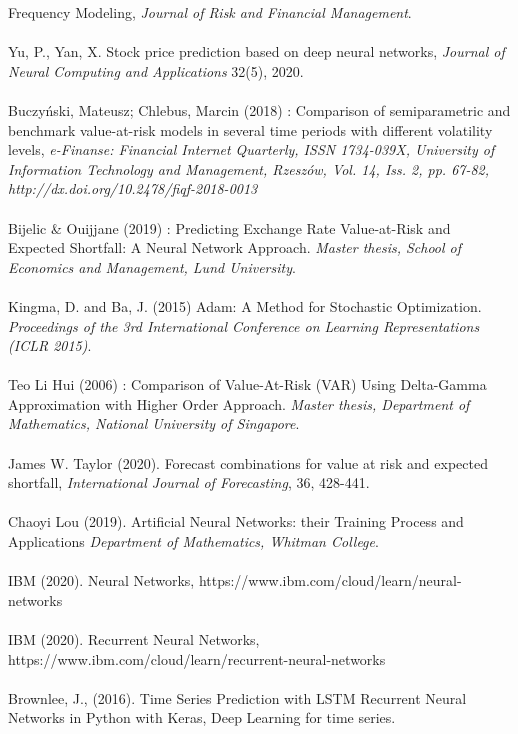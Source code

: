\documentclass[a4paper,11pt,oneside]{book}
\begin{document}
Frequency Modeling, \textit{Journal of Risk and Financial Management}.\\\\
Yu, P., Yan, X. Stock price prediction based on deep neural networks, \textit{Journal of Neural Computing and Applications} 32(5), 2020.\\\\
Buczyński, Mateusz; Chlebus, Marcin (2018) : Comparison of semiparametric
and benchmark value-at-risk models in several time periods with different volatility
levels, \textit{e-Finanse: Financial Internet Quarterly, ISSN 1734-039X, University of Information
Technology and Management, Rzeszów, Vol. 14, Iss. 2, pp. 67-82,
http://dx.doi.org/10.2478/fiqf-2018-0013}\\\\
Bijelic \& Ouijjane (2019) : Predicting Exchange Rate
Value-at-Risk and Expected Shortfall:
A Neural Network Approach. \textit{Master thesis, School of Economics and Management, Lund University}.\\\\
Kingma, D. and Ba, J. (2015) Adam: A Method for Stochastic Optimization. \textit{Proceedings of the 3rd International Conference on Learning Representations (ICLR 2015)}.\\\\
Teo Li Hui (2006) : Comparison of Value-At-Risk (VAR) Using Delta-Gamma
Approximation with Higher Order Approach. \textit{Master thesis, Department of Mathematics, National University of Singapore}.\\\\
James W. Taylor (2020). Forecast combinations for value at risk and expected shortfall, \textit{International Journal of Forecasting}, 36, 428-441.\\\\
Chaoyi Lou (2019). Artificial Neural Networks:
their Training Process and Applications \textit{Department of Mathematics, Whitman College}.\\\\
IBM (2020). Neural Networks, https://www.ibm.com/cloud/learn/neural-networks\\\\
IBM (2020). Recurrent Neural Networks, https://www.ibm.com/cloud/learn/recurrent-neural-networks\\\\
Brownlee, J., (2016). Time Series Prediction with LSTM Recurrent Neural Networks
in Python with Keras, Deep Learning for time series.\\\\
\end{document}
